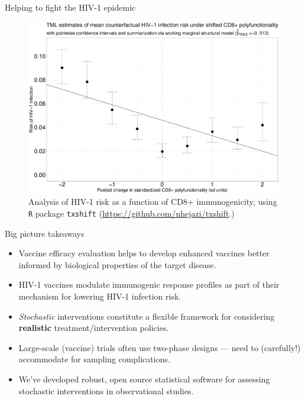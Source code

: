 \documentclass{beamer}
\begin{document}

\begin{frame}[c]{Helping to fight the HIV-1 epidemic}

\vspace{-1.5em}
\begin{figure}[H]
  \centering
  \includegraphics[scale=0.17]{cd8_msm_tmle_summary}
  \caption{
    Analysis of HIV-1 risk as a function of CD8+ immunogenicity, using
    \texttt{R} package \texttt{txshift}
    (\url{https://github.com/nhejazi/txshift}.)
  }
\end{figure}

\note{
}

\end{frame}


\begin{frame}[c]{Big picture takeaways}

\begin{center}
\begin{itemize}
  \itemsep8pt
  \item Vaccine efficacy evaluation helps to develop enhanced vaccines better
    informed by biological properties of the target disease.
  \item HIV-1 vaccines modulate immunogenic response profiles as part of their
    mechanism for lowering HIV-1 infection risk.
  \item \textit{Stochastic} interventions constitute a flexible framework for
    considering \textbf{realistic} treatment/intervention policies.
  \item Large-scale (vaccine) trials often use two-phase designs --- need to
    (carefully!) accommodate for sampling complications.
  \item We've developed robust, open source statistical software for assessing
    stochastic interventions in observational studies.
\end{itemize}
\end{center}

\note{
}

\end{frame}
\end{document}
